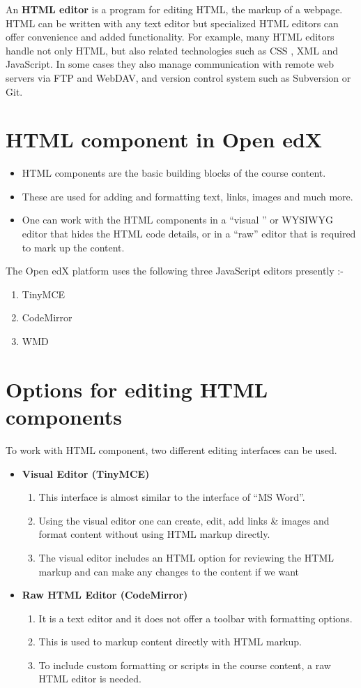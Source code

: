 An \textbf{HTML editor} is a program for editing HTML, the markup of a webpage. HTML can be written
with any text editor but specialized HTML editors can offer convenience and added functionality.
For example, many HTML editors handle not only HTML, but also related technologies such
as CSS , XML and JavaScript. In some cases they also manage communication with remote web
servers via FTP and WebDAV, and version control system such as Subversion or Git.

\section{HTML component in Open edX}
\begin{itemize}
	\item HTML components are the basic building blocks of the course content.
	\item These are used for adding and formatting text, links, images and much more.
	\item One can work with the HTML components in a “visual ” or WYSIWYG editor that hides the
HTML code details, or in a “raw” editor that is required to mark up the content.
\end{itemize}
The Open edX platform uses the following three JavaScript editors presently :-
\begin{enumerate}
	\item TinyMCE
	\item CodeMirror
	\item WMD
\end{enumerate}

\section{Options for editing HTML components}
To work with HTML component, two different editing interfaces can be used.
\begin{itemize}
	\item \textbf{Visual Editor (TinyMCE) }
		\begin{enumerate}
			\item This interface is almost similar to the interface of “MS Word”.
			\item Using the visual editor one can create, edit, add links \& images and format content
without using HTML markup directly.
			\item The visual editor includes an HTML option for reviewing the HTML markup and can
make any changes to the content if we want
		\end{enumerate}
	\item \textbf{Raw HTML Editor (CodeMirror) }
		\begin{enumerate}
			\item It is a text editor and it does not offer a toolbar with formatting options.
			\item This is used to markup content directly with HTML markup.
			\item To include custom formatting or scripts in the course content, a raw HTML editor
is needed.
		\end{enumerate}
\end{itemize}

